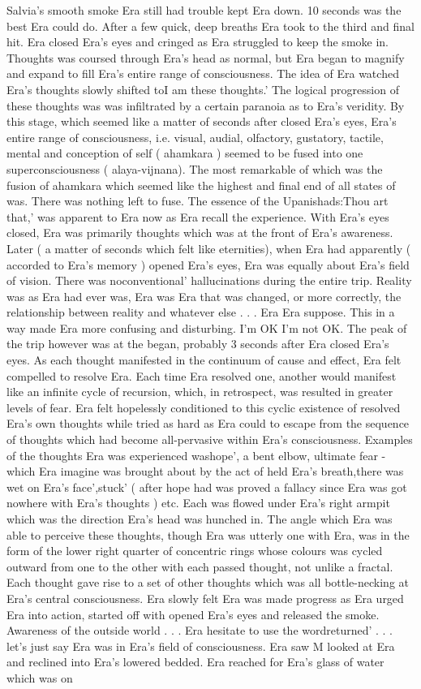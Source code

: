 \documentclass[12pt]{book}
\begin{document}
Salvia's smooth smoke Era still had trouble kept Era down. 10 seconds was the best Era could do. After a few quick, deep breaths Era took to the third and final hit. Era closed Era's eyes and cringed as Era struggled to keep the smoke in. Thoughts was coursed through Era's head as normal, but Era began to magnify and expand to fill Era's entire range of consciousness. The idea of Era watched Era's thoughts slowly shifted toI am these thoughts.' The logical progression of these thoughts was was infiltrated by a certain paranoia as to Era's veridity. By this stage, which seemed like a matter of seconds after closed Era's eyes, Era's entire range of consciousness, i.e. visual, audial, olfactory, gustatory, tactile, mental and conception of self ( ahamkara ) seemed to be fused into one superconsciousness ( alaya-vijnana). The most remarkable of which was the fusion of ahamkara which seemed like the highest and final end of all states of was. There was nothing left to fuse. The essence of the Upanishads:Thou art that,' was apparent to Era now as Era recall the experience. With Era's eyes closed, Era was primarily thoughts which was at the front of Era's awareness. Later ( a matter of seconds which felt like eternities), when Era had apparently ( accorded to Era's memory ) opened Era's eyes, Era was equally about Era's field of vision. There was noconventional' hallucinations during the entire trip. Reality was as Era had ever was, Era was Era that was changed, or more correctly, the relationship between reality and whatever else . . .  Era Era suppose. This in a way made Era more confusing and disturbing. I'm OK I'm not OK. The peak of the trip however was at the began, probably 3 seconds after Era closed Era's eyes. As each thought manifested in the continuum of cause and effect, Era felt compelled to resolve Era. Each time Era resolved one, another would manifest like an infinite cycle of recursion, which, in retrospect, was resulted in greater levels of fear. Era felt hopelessly conditioned to this cyclic existence of resolved Era's own thoughts while tried as hard as Era could to escape from the sequence of thoughts which had become all-pervasive within Era's consciousness. Examples of the thoughts Era was experienced washope', a bent elbow, ultimate fear - which Era imagine was brought about by the act of held Era's breath,there was wet on Era's face',stuck' ( after hope had was proved a fallacy since Era was got nowhere with Era's thoughts ) etc. Each was flowed under Era's right armpit which was the direction Era's head was hunched in. The angle which Era was able to perceive these thoughts, though Era was utterly one with Era, was in the form of the lower right quarter of concentric rings whose colours was cycled outward from one to the other with each passed thought, not unlike a fractal. Each thought gave rise to a set of other thoughts which was all bottle-necking at Era's central consciousness. Era slowly felt Era was made progress as Era urged Era into action, started off with opened Era's eyes and released the smoke. Awareness of the outside world . . .  Era hesitate to use the wordreturned' . . .  let's just say Era was in Era's field of consciousness. Era saw M looked at Era and reclined into Era's lowered bedded. Era reached for Era's glass of water which was on 
\end{document}
